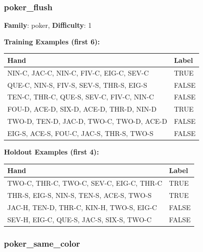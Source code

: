 \documentclass[10pt,a4paper]{article}
\begin{document}
\vspace{0.5cm}

\subsubsection{poker\_flush}

\textbf{Family}: poker, \textbf{Difficulty}: 1

\textbf{Training Examples (first 6):}

\begin{small}
\begin{tabular}{p{8cm}l}
\toprule
Hand & Label \\
\midrule
NIN-C, JAC-C, NIN-C, FIV-C, EIG-C, SEV-C & \textcolor{positive}{TRUE} \\
QUE-C, NIN-S, FIV-S, SEV-S, THR-S, EIG-S & \textcolor{negative}{FALSE} \\
TEN-C, THR-C, QUE-S, SEV-C, FIV-C, NIN-C & \textcolor{negative}{FALSE} \\
FOU-D, ACE-D, SIX-D, ACE-D, THR-D, NIN-D & \textcolor{positive}{TRUE} \\
TWO-D, TEN-D, JAC-D, TWO-C, TWO-D, ACE-D & \textcolor{negative}{FALSE} \\
EIG-S, ACE-S, FOU-C, JAC-S, THR-S, TWO-S & \textcolor{negative}{FALSE} \\
\bottomrule
\end{tabular}
\end{small}

\textbf{Holdout Examples (first 4):}

\begin{small}
\begin{tabular}{p{8cm}l}
\toprule
Hand & Label \\
\midrule
TWO-C, THR-C, TWO-C, SEV-C, EIG-C, THR-C & \textcolor{positive}{TRUE} \\
THR-S, EIG-S, NIN-S, TEN-S, ACE-S, TWO-S & \textcolor{positive}{TRUE} \\
JAC-H, TEN-D, THR-C, KIN-H, TWO-S, EIG-C & \textcolor{negative}{FALSE} \\
SEV-H, EIG-C, QUE-S, JAC-S, SIX-S, TWO-C & \textcolor{negative}{FALSE} \\
\bottomrule
\end{tabular}
\end{small}

\vspace{0.5cm}

\subsubsection{poker\_same\_color}
\end{document}
